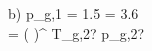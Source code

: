 b) \quad p_{g,1} = 1.5  \quad {} = 3.6 \\
\quad {} = \left(  \right)^{} \quad T_{g,2}? \quad p_{g,2}? \\